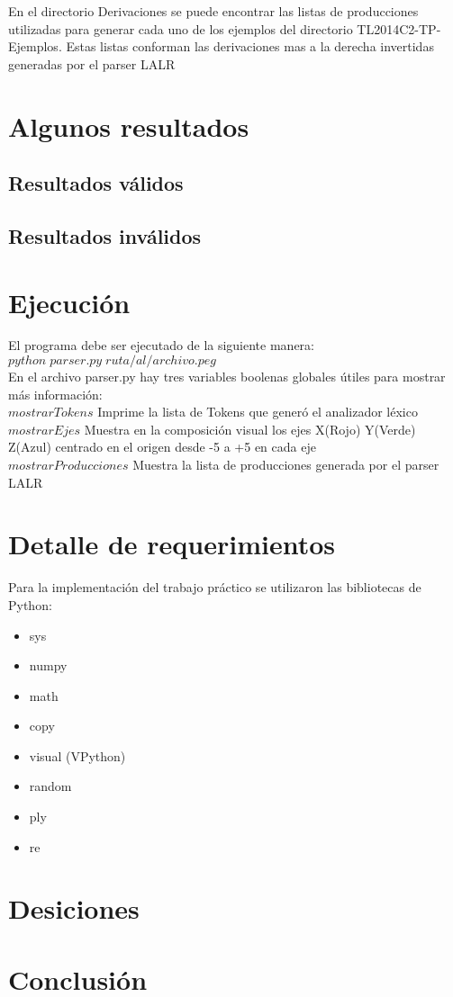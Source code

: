 \documentclass[10pt,a4paper]{article}
\begin{document}
En el directorio Derivaciones se puede encontrar las listas de producciones utilizadas para generar cada uno de los ejemplos del directorio TL2014C2-TP-Ejemplos. Estas listas conforman las derivaciones mas a la derecha invertidas generadas por el parser LALR
\section{Algunos resultados}
\subsection{Resultados válidos}
\subsection{Resultados inválidos}
\section{Ejecución}
El programa debe ser ejecutado de la siguiente manera:\\
$python\;parser.py\;ruta/al/archivo.peg$\\

En el archivo parser.py hay tres variables boolenas globales útiles para mostrar más información:\\
	$mostrarTokens$ Imprime la lista de Tokens que generó el analizador léxico\\
	$mostrarEjes$ Muestra en la composición visual los ejes X(Rojo) Y(Verde) Z(Azul) centrado en el origen desde -5 a +5 en cada eje\\
	$mostrarProducciones$ Muestra la lista de producciones generada por el parser LALR\\
\section{Detalle de requerimientos}
	Para la implementación del trabajo práctico se utilizaron las bibliotecas de Python:
\begin{itemize}
\item sys
\item numpy
\item math
\item copy 
\item visual (VPython)
\item random
\item ply
\item re
\end{itemize}
\section{Desiciones}
\section{Conclusión}
\end{document}
